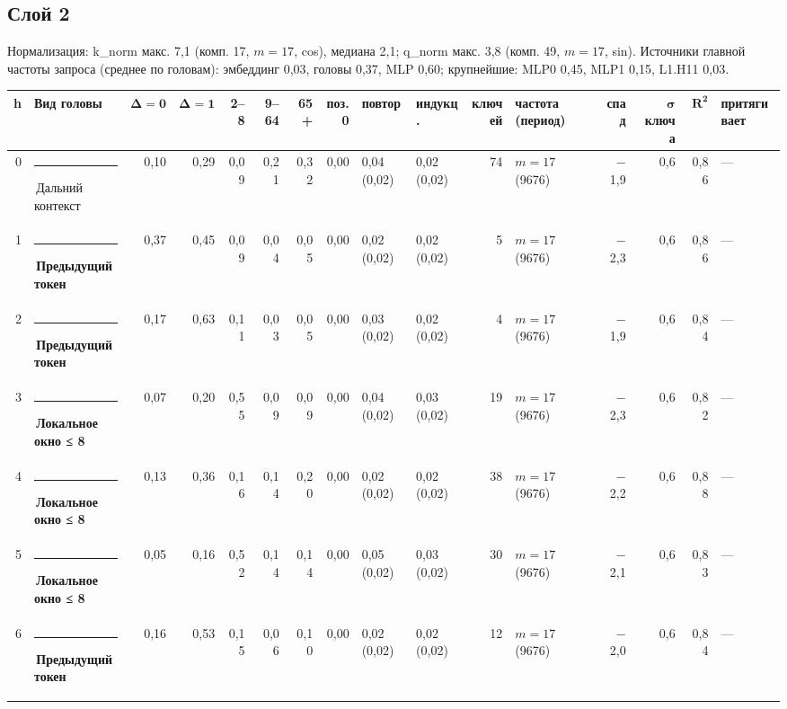 \documentclass[10pt]{article}
\begin{document}
\begin{minipage}{\linewidth}
\subsection*{Слой 2}
{\small\color{ink2} Нормализация: k\_norm макс. 7,1 (комп. 17, $m{=}17$, cos), медиана 2,1; q\_norm макс. 3,8 (комп. 49, $m{=}17$, sin). Источники главной частоты запроса (среднее по головам): эмбеддинг 0,03, головы 0,37, MLP 0,60; крупнейшие: MLP0 0,45, MLP1 0,15, L1.H11 0,03.}
\begin{center}{\footnotesize\begin{tabular}{|r|l|r|r|r|r|r|r|l|l|r|l|r|r|r|l|}
\hline
\rowcolor{head}\textbf{h} & \textbf{Вид головы} & $\boldsymbol{\Delta{=}0}$ & $\boldsymbol{\Delta{=}1}$ & \textbf{2–8} & \textbf{9–64} & \textbf{65+} & \textbf{поз.\,0} & \textbf{повтор} & \textbf{индукц.} & \textbf{ключей} & \textbf{частота (период)} & \textbf{спад} & $\boldsymbol{\sigma}$ \textbf{ключа} & $\boldsymbol{R^2}$ & \textbf{притягивает} \\ \hline
0 & \textcolor[HTML]{C3C2B7}{\rule{0.62em}{0.62em}}\,Дальний контекст & 0,10 & 0,29 & 0,09 & 0,21 & 0,32 & 0,00 & 0,04 (0,02) & 0,02 (0,02) & 74 & $m{=}17$ (9676) & $-$1,9 & 0,6 & 0,86 & — \\ \hline
1 & \textcolor[HTML]{2A78D6}{\rule{0.62em}{0.62em}}\,\textbf{Предыдущий токен} & 0,37 & 0,45 & 0,09 & 0,04 & 0,05 & 0,00 & 0,02 (0,02) & 0,02 (0,02) & 5 & $m{=}17$ (9676) & $-$2,3 & 0,6 & 0,86 & — \\ \hline
2 & \textcolor[HTML]{2A78D6}{\rule{0.62em}{0.62em}}\,\textbf{Предыдущий токен} & 0,17 & 0,63 & 0,11 & 0,03 & 0,05 & 0,00 & 0,03 (0,02) & 0,02 (0,02) & 4 & $m{=}17$ (9676) & $-$1,9 & 0,6 & 0,84 & — \\ \hline
3 & \textcolor[HTML]{1BAF7A}{\rule{0.62em}{0.62em}}\,\textbf{Локальное окно ≤ 8} & 0,07 & 0,20 & 0,55 & 0,09 & 0,09 & 0,00 & 0,04 (0,02) & 0,03 (0,02) & 19 & $m{=}17$ (9676) & $-$2,3 & 0,6 & 0,82 & — \\ \hline
4 & \textcolor[HTML]{1BAF7A}{\rule{0.62em}{0.62em}}\,\textbf{Локальное окно ≤ 8} & 0,13 & 0,36 & 0,16 & 0,14 & 0,20 & 0,00 & 0,02 (0,02) & 0,02 (0,02) & 38 & $m{=}17$ (9676) & $-$2,2 & 0,6 & 0,88 & — \\ \hline
5 & \textcolor[HTML]{1BAF7A}{\rule{0.62em}{0.62em}}\,\textbf{Локальное окно ≤ 8} & 0,05 & 0,16 & 0,52 & 0,14 & 0,14 & 0,00 & 0,05 (0,02) & 0,03 (0,02) & 30 & $m{=}17$ (9676) & $-$2,1 & 0,6 & 0,83 & — \\ \hline
6 & \textcolor[HTML]{2A78D6}{\rule{0.62em}{0.62em}}\,\textbf{Предыдущий токен} & 0,16 & 0,53 & 0,15 & 0,06 & 0,10 & 0,00 & 0,02 (0,02) & 0,02 (0,02) & 12 & $m{=}17$ (9676) & $-$2,0 & 0,6 & 0,84 & — \\ \hline

\end{tabular}}
\end{center}
\end{minipage}
\end{document}

